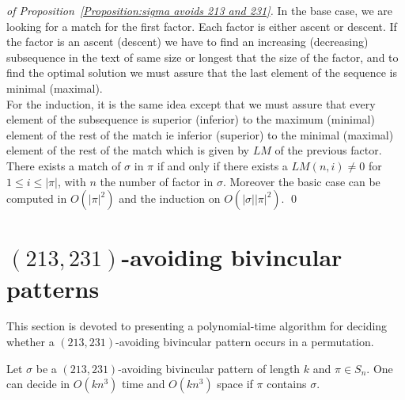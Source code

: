 \documentclass[a4paper]{llncs}
\newcommand{\ptext}{\pi}
\newcommand{\pmotif}{\sigma}
\newcounter{num}
\begin{document}
\begin{proof}[of Proposition~\ref{Proposition:sigma avoids 213 and 231}]
In the base case, 
we are looking for a match for the first factor.
Each factor is either ascent or descent.
If the factor is an ascent (descent)
we have to find an increasing (decreasing) subsequence
in the text of same size or longest that 
the size of the factor,
and to find the optimal solution 
we must assure that the last element
of the sequence is minimal (maximal).\\
For the induction, it is the same idea
except that we must assure that 
every element of the subsequence is superior (inferior)
to the maximum (minimal) element of the rest of the match
ie inferior (superior) to the minimal (maximal) element of the rest of the match
which is given by $LM$ of
the previous factor.\\

There exists a match of $\pmotif$ in $\ptext$ if and only if
there exists a $LM(n,i)\neq 0$ for $1 \leq i \leq |\ptext|$,
with $n$ the number of factor in $\pmotif$.
Moreover the basic case can be computed in $O(|\ptext|^2)$
and the induction on $O(|\pmotif||\ptext|^2)$.
\qed
\end{proof}
					

\section{$(213,231)$-avoiding bivincular patterns}	
	\label{section:bivincular}

		This section is devoted to presenting a polynomial-time algorithm for deciding whether
	a $(213,231)$-avoiding bivincular pattern occurs in a permutation.

	\begin{proposition}
		\label{Proposition:bivincular pattern}
			Let $\sigma$ be a $(213,231)$-avoiding bivincular pattern of length $k$
			and $\pi \in S_n$.
			One can decide in $O(kn^3)$ time
			and $O(kn^3)$ space if $\pi$ contains $\sigma$.
	\end{proposition}
\end{document}
